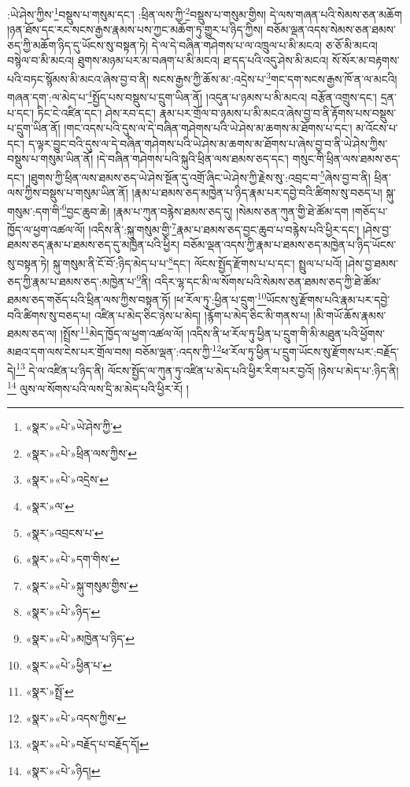 :ཡེ་ཤེས་ཀྱིས་\footnote{«སྣར་»«པེ་»ཡེ་ཤེས་ཀྱི་}བསྡུས་པ་གསུམ་དང་། :ཕྲིན་ལས་ཀྱི་\footnote{«སྣར་»«པེ་»ཕྲིན་ལས་ཀྱིས་}བསྡུས་པ་གསུམ་གྱིས། དེ་ལས་གཞན་པའི་སེམས་ཅན་མཆོག །ཉན་ཐོས་དང་རང་སངས་རྒྱས་རྣམས་པས་ཀྱང་མཆོག་ཏུ་གྱུར་པ་ཉིད་ཀྱིས། བཅོམ་ལྡན་འདས་སེམས་ཅན་ཐམས་ཅད་ཀྱི་མཆོག་ཉིད་དུ་ཡོངས་སུ་བསྟན་ཏེ། དེ་ལ་དེ་བཞིན་གཤེགས་པ་ལ་འཁྲུལ་པ་མི་མངའ། ཅ་ཅོ་མི་མངའ། བསྙེལ་བ་མི་མངའ། ཐུགས་མཉམ་པར་མ་བཞག་པ་མི་མངའ། ཐ་དད་པའི་འདུ་ཤེས་མི་མངའ། སོ་སོར་མ་བརྟགས་པའི་བཏང་སྙོམས་མི་མངའ་ཞེས་བྱ་བ་ནི། སངས་རྒྱས་ཀྱི་ཆོས་མ་:འདྲེས་པ་\footnote{«སྣར་»«པེ་»འདྲེས་}གང་དག་སངས་རྒྱས་ཁོ་ན་ལ་མངའི། གཞན་དག་:ལ་མེད་པ་\footnote{«སྣར་»ལ་}སྤྱོད་པས་བསྡུས་པ་དྲུག་ཡིན་ནོ། །འདུན་པ་ཉམས་པ་མི་མངའ། བརྩོན་འགྲུས་དང་། དྲན་པ་དང་། ཏིང་ངེ་འཛིན་དང་། ཤེས་རབ་དང་། རྣམ་པར་གྲོལ་བ་ཉམས་པ་མི་མངའ་ཞེས་བྱ་བ་ནི་རྟོགས་པས་བསྡུས་པ་དྲུག་ཡིན་ནོ། །གང་འདས་པའི་དུས་ལ་དེ་བཞིན་གཤེགས་པའི་ཡེ་ཤེས་མ་ཆགས་མ་ཐོགས་པ་དང་། མ་འོངས་པ་དང་། ད་ལྟར་བྱུང་བའི་དུས་ལ་དེ་བཞིན་གཤེགས་པའི་ཡེ་ཤེས་མ་ཆགས་མ་ཐོགས་པ་ཞེས་བྱ་བ་ནི་ཡེ་ཤེས་ཀྱིས་བསྡུས་པ་གསུམ་ཡིན་ནོ། །དེ་བཞིན་གཤེགས་པའི་སྐུའི་ཕྲིན་ལས་ཐམས་ཅད་དང་། གསུང་གི་ཕྲིན་ལས་ཐམས་ཅད་དང་། །ཐུགས་ཀྱི་ཕྲིན་ལས་ཐམས་ཅད་ཡེ་ཤེས་སྔོན་དུ་འགྲོ་ཞིང་ཡེ་ཤེས་ཀྱི་རྗེས་སུ་:འབྲང་བ་\footnote{«སྣར་»འབྲངས་པ་}ཞེས་བྱ་བ་ནི། ཕྲིན་ལས་ཀྱིས་བསྡུས་པ་གསུམ་ཡིན་ནོ། །རྣམ་པ་ཐམས་ཅད་མཁྱེན་པ་ཉིད་རྣམ་པར་དབྱེ་བའི་ཚིགས་སུ་བཅད་པ། སྐུ་གསུམ་:དག་གི་\footnote{«སྣར་»«པེ་»དག་གིས་}བྱང་ཆུབ་ཆེ། །རྣམ་པ་ཀུན་བརྙེས་ཐམས་ཅད་དུ། །སེམས་ཅན་ཀུན་གྱི་ཐེ་ཚོམ་དག །གཅོད་པ་ཁྱོད་ལ་ཕྱག་འཚལ་ལོ། །འདིས་ནི་:སྐུ་གསུམ་གྱི་\footnote{«སྣར་»«པེ་»སྐུ་གསུམ་གྱིས་}རྣམ་པ་ཐམས་ཅད་བྱང་ཆུབ་པ་བརྙེས་པའི་ཕྱིར་དང་། །ཤེས་བྱ་ཐམས་ཅད་རྣམ་པ་ཐམས་ཅད་དུ་མཁྱེན་པའི་ཕྱིར། བཅོམ་ལྡན་འདས་ཀྱི་རྣམ་པ་ཐམས་ཅད་མཁྱེན་པ་ཉིད་ཡོངས་སུ་བསྟན་ཏེ། སྐུ་གསུམ་ནི་ངོ་བོ་:ཉིད་མེད་པ་པ་\footnote{«སྣར་»«པེ་»ཉིད་}དང་། ལོངས་སྤྱོད་རྫོགས་པ་པ་དང་། སྤྲུལ་པ་པའོ། །ཤེས་བྱ་ཐམས་ཅད་ཀྱི་རྣམ་པ་ཐམས་ཅད་:མཁྱེན་པ་\footnote{«སྣར་»«པེ་»མཁྱེན་པ་ཉིད་}ནི། འདིར་ལྷ་དང་མི་ལ་སོགས་པའི་སེམས་ཅན་ཐམས་ཅད་ཀྱི་ཐེ་ཚོམ་ཐམས་ཅད་གཅོད་པའི་ཕྲིན་ལས་ཀྱིས་བསྟན་ཏོ། །ཕ་རོལ་ཏུ་:ཕྱིན་པ་དྲུག་\footnote{«སྣར་»«པེ་»ཕྱིན་པ་}ཡོངས་སུ་རྫོགས་པའི་རྣམ་པར་དབྱེ་བའི་ཚིགས་སུ་བཅད་པ། འཛིན་པ་མེད་ཅིང་ཉེས་པ་མེད། །རྙོག་པ་མེད་ཅིང་མི་གནས་པ། །མི་གཡོ་ཆོས་རྣམས་ཐམས་ཅད་ལ། །སྤྲོས་\footnote{«སྣར་»སྤྲོ་}མེད་ཁྱོད་ལ་ཕྱག་འཚལ་ལོ། །འདིས་ནི་ཕ་རོལ་ཏུ་ཕྱིན་པ་དྲུག་གི་མི་མཐུན་པའི་ཕྱོགས་མཐའ་དག་ལས་ངེས་པར་གྲོལ་བས། བཅོམ་ལྡན་:འདས་ཀྱི་\footnote{«སྣར་»«པེ་»འདས་ཀྱིས་}ཕ་རོལ་ཏུ་ཕྱིན་པ་དྲུག་ཡོངས་སུ་རྫོགས་པར་:བརྗོད་དེ།\footnote{«སྣར་»«པེ་»བརྗོད་པ་བརྗོད་དོ།} དེ་ལ་འཛིན་པ་ཉིད་ནི། ལོངས་སྤྱོད་ལ་ཀུན་ཏུ་འཛིན་པ་མེད་པའི་ཕྱིར་རིག་པར་བྱའོ། །ཉེས་པ་མེད་པ་:ཉིད་ནི།\footnote{«སྣར་»«པེ་»ཉིད།} ལུས་ལ་སོགས་པའི་ལས་དྲི་མ་མེད་པའི་ཕྱིར་རོ། །
